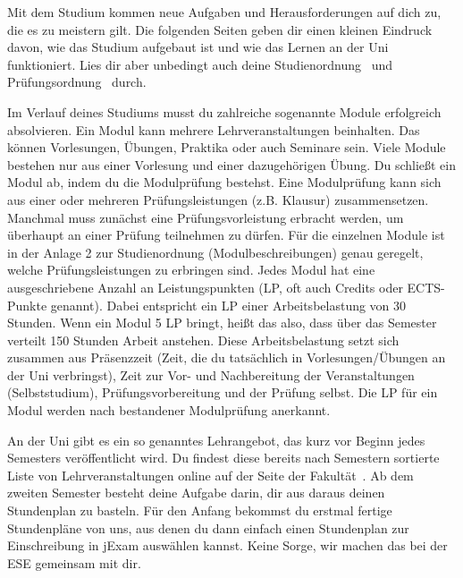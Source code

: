 
Mit dem Studium kommen neue Aufgaben und Herausforderungen auf dich zu, die es zu meistern gilt.
Die folgenden Seiten geben dir einen kleinen Eindruck davon, wie das Studium aufgebaut ist und wie das Lernen an der Uni funktioniert.
Lies dir aber unbedingt auch deine Studienordnung~
und Prüfungsordnung~ durch.

Im Verlauf deines Studiums musst du zahlreiche sogenannte Module erfolgreich absolvieren. Ein Modul kann mehrere Lehrveranstaltungen beinhalten. Das können Vorlesungen,
Übungen, Praktika oder auch Seminare sein. Viele Module bestehen nur aus einer Vorlesung und einer dazugehörigen Übung. Du schließt ein Modul ab, indem du die Modulprüfung
bestehst. Eine Modulprüfung kann sich aus einer oder mehreren Prüfungsleistungen (z.B. Klausur) zusammensetzen. Manchmal muss zunächst eine Prüfungsvorleistung erbracht werden, um
überhaupt an einer Prüfung teilnehmen zu dürfen. Für die einzelnen Module ist in der Anlage 2 zur Studienordnung (Modulbeschreibungen) genau geregelt, welche Prüfungsleistungen zu
erbringen sind.
Jedes Modul hat eine ausgeschriebene Anzahl an Leistungspunkten (LP, oft auch Credits oder ECTS-Punkte genannt). Dabei entspricht ein LP einer Arbeitsbelastung von 30 Stunden. Wenn ein Modul 5 LP bringt, heißt das also,
dass über das Semester verteilt 150 Stunden Arbeit anstehen. Diese Arbeitsbelastung setzt sich zusammen aus Präsenzzeit (Zeit, die du tatsächlich in Vorlesungen/Übungen an der Uni verbringst),
Zeit zur Vor- und Nachbereitung der Veranstaltungen (Selbststudium), Prüfungsvorbereitung und der Prüfung selbst. Die LP für ein Modul werden nach bestandener Modulprüfung anerkannt.


An der Uni gibt es ein so genanntes Lehrangebot, das kurz vor Beginn jedes Semesters veröffentlicht wird.
Du findest diese bereits nach Semestern sortierte Liste von Lehrveranstaltungen online auf der Seite der Fakultät~.
Ab dem zweiten Semester besteht deine Aufgabe darin, dir aus daraus deinen Stundenplan zu basteln.
Für den Anfang bekommst du erstmal fertige Stundenpläne von uns, aus denen du dann einfach einen Stundenplan zur Einschreibung in jExam auswählen kannst. Keine Sorge, wir machen das bei der ESE gemeinsam mit dir.

